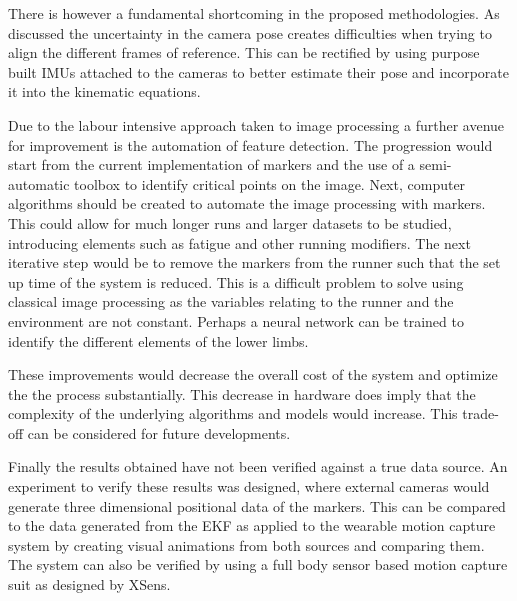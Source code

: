 There is however a fundamental shortcoming in the proposed methodologies. As discussed the uncertainty in the camera pose creates difficulties when trying to align the different frames of reference. This can be rectified by using purpose built IMUs attached to the cameras to better estimate their pose and incorporate it into the kinematic equations.

Due to the labour intensive approach taken to image processing a further avenue for improvement is the automation of feature detection. The progression would start from the current implementation of markers and the use of a semi-automatic toolbox to identify critical points on the image. Next, computer algorithms should be created to automate the image processing with markers. This could allow for much longer runs and larger datasets to be studied, introducing elements such as fatigue and other running modifiers. The next iterative step would be to remove the markers from the runner such that the set up time of the system is reduced. This is a difficult problem to solve using classical image processing as the variables relating to the runner and the environment are not constant. Perhaps a neural network can be trained to identify the different elements of the lower limbs.

These improvements would decrease the overall cost of the system and optimize the the process substantially. This decrease in hardware does imply that the complexity of the underlying algorithms and models would increase. This trade-off can be considered for future developments.

Finally the results obtained have not been verified against a true data source. An experiment to verify these results was designed, where external cameras would generate three dimensional positional data of the markers. This can be compared to the data generated from the EKF as applied to the wearable motion capture system by creating visual animations from both sources and comparing them. The system can also be verified by using a full body sensor based motion capture suit as designed by XSens.








